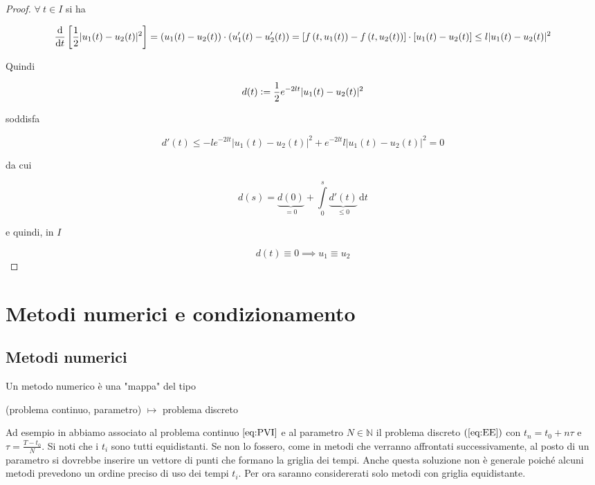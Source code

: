 \documentclass[hidelinks, 10pt]{report}
\begin{document}
\begin{proof}
$ \forall\ t \in I $ si ha

\begin{dmath*}
{ \frac{\mathrm{d}}{\mathrm{d}t} \left[ \frac{1}{2} \vert u_{1}(t) - u_{2}(t) \vert^{2} \right] } = { \left( u_{1}(t) - u_{2}(t) \right) \cdot \left( u_{1}' (t) - u_{2}' (t) \right) } = \\ { [ f \left( t, u_{1}(t) \right) - f \left( t, u_{2}(t) \right) ] \cdot [u_{1}(t) - u_{2}(t)] } \le { l \vert u_{1}(t) - u_{2} (t) \vert^{2} }
\end{dmath*}

Quindi

\[ d(t) \vcentcolon= \frac{1}{2} e^{-2lt} \vert u_{1}(t) - u_{2}(t) \vert^{2} \]

soddisfa

\[ d'(t) \le -l e^{-2lt} \vert u_{1}(t) - u_{2}(t) \vert^{2} + e^{-2lt} l \vert u_{1}(t) - u_{2}(t) \vert^{2} = 0 \]

da cui

\[ d(s) = \underbrace{d(0)}_{= 0} + \int\limits_{0}^{s} \underbrace{d'(t)}_{\le 0} \, \mathrm{d}t \]

e quindi, in $ I $

\[ d(t) \equiv 0 \implies u_{1} \equiv u_{2}  \]
\end{proof}

\section{Metodi numerici e condizionamento}
\subsection{Metodi numerici}

Un metodo numerico \`e una "mappa" del tipo

\begin{center}
(problema continuo, parametro) $ \mapsto $ problema discreto
\end{center}

Ad esempio in  abbiamo associato al problema continuo $ \ref{eq:PVI} $ e al parametro $ N \in \mathbb{N} $ il problema discreto $ (\ref{eq:EE}) $ con $ t_{n} = t_{0} + n \tau $ e $ \tau = \frac{T - t_{0}}{N} $. Si noti che i $ t_{i} $ sono tutti equidistanti. Se non lo fossero, come in metodi che verranno affrontati successivamente, al posto di un parametro si dovrebbe inserire un vettore di punti che formano la griglia dei tempi. Anche questa soluzione non \`e generale poich\'e alcuni metodi prevedono un ordine preciso di uso dei tempi $ t_{i} $. Per ora saranno considererati solo metodi con griglia equidistante.
\end{document}
